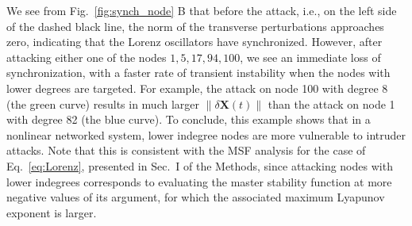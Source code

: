\documentclass[%
 reprint,
 amsmath,amssymb,
 aip,
]{revtex4-2}
\def \bX {\pmb{X}}
\def \bb {\pmb{b}}
\theoremstyle{italichead}
\theoremstyle{definition}
\begin{document}
{We see from Fig.~\ref{fig:synch_node} B that before the attack, i.e., on the left side of the dashed black line, the norm of the transverse perturbations approaches zero, indicating that the Lorenz oscillators have synchronized. However, after attacking either one of the nodes $1,5,17,94,100$,
we see an immediate loss of synchronization, with a faster rate of transient instability when the nodes with lower degrees are targeted. For example, the attack on node 100 with degree 8 (the green curve) results in much larger $\| \delta \bX(t) \|$ than the attack on node 1 with degree 82 (the blue curve).
To conclude, this example shows that in a nonlinear networked system, lower indegree nodes are more vulnerable to intruder attacks. {Note that this is consistent with the MSF analysis for the case of Eq.~\eqref{eq:Lorenz}, presented in Sec.\ I of the Methods, since attacking nodes with lower indegrees corresponds to evaluating the master stability function at more negative values of its argument, for which the associated maximum Lyapunov exponent is larger.}









}
\end{document}
